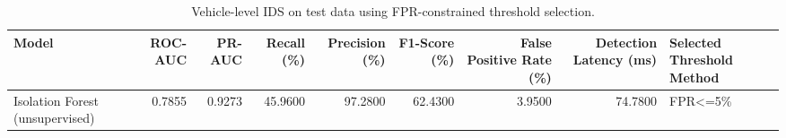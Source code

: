 \begin{table}[t]
\centering
\begin{tabular}{lrrrrrrrl}
\toprule
Model & ROC-AUC & PR-AUC & Recall (\%) & Precision (\%) & F1-Score (\%) & False Positive Rate (\%) & Detection Latency (ms) & Selected Threshold Method \\
\midrule
Isolation Forest (unsupervised) & 0.7855 & 0.9273 & 45.9600 & 97.2800 & 62.4300 & 3.9500 & 74.7800 & FPR<=5\% \\
\bottomrule
\end{tabular}
\caption{Vehicle-level IDS on test data using FPR-constrained threshold selection.}
\label{tab:vehicle-ids}
\end{table}
